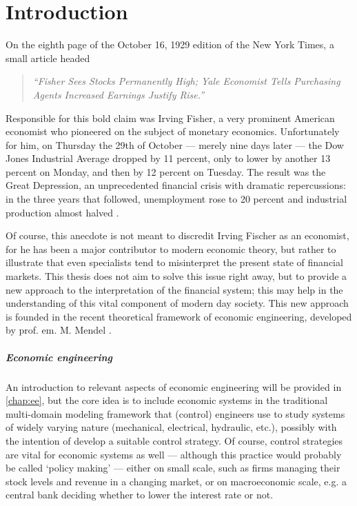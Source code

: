 \chapter{Introduction}
\label{chap:intro}
On the eighth page of the October 16, 1929 edition of the New York Times, a small article headed \cite{NYT1929}
\begin{quote}
    \emph{``Fisher Sees Stocks Permanently High; Yale Economist Tells Purchasing Agents Increased Earnings Justify Rise.''} 
\end{quote}
Responsible for this bold claim was Irving Fisher, a very prominent American economist who pioneered on the subject of monetary economics. Unfortunately for him, on Thursday the 29th of October --- merely nine days later --- the Dow Jones Industrial Average dropped by 11 percent, only to lower by another 13 percent on Monday, and then by 12 percent on Tuesday. The result was the Great Depression, an unprecedented financial crisis with dramatic repercussions: in the three years that followed, unemployment rose to 20 percent and industrial production almost halved \cite{gdepression}. 

Of course, this anecdote is not meant to discredit Irving Fischer as an economist, for he has been a major contributor to modern economic theory, but rather to illustrate that even specialists tend to misinterpret the present state of financial markets. This thesis does not aim to solve this issue right away, but to provide a new approach to the interpretation of the financial system; this may help in the understanding of this vital component of modern day society. This new approach is founded in the recent theoretical framework of economic engineering, developed by prof. em. M. Mendel \cite{Mendel2019}. 

\paragraph{Economic engineering} An introduction to relevant aspects of economic engineering will be provided in \cref{chap:ee}, but the core idea is to include economic systems in the traditional multi-domain modeling framework that (control) engineers use to study systems of widely varying nature (mechanical, electrical, hydraulic, etc.), possibly with the intention of develop a suitable control strategy. Of course, control strategies are vital for economic systems as well --- although this practice would probably be called `policy making' --- either on small scale, such as firms managing their stock levels and revenue in a changing market, or on macroeconomic scale, e.g. a central bank deciding whether to lower the interest rate or not.

